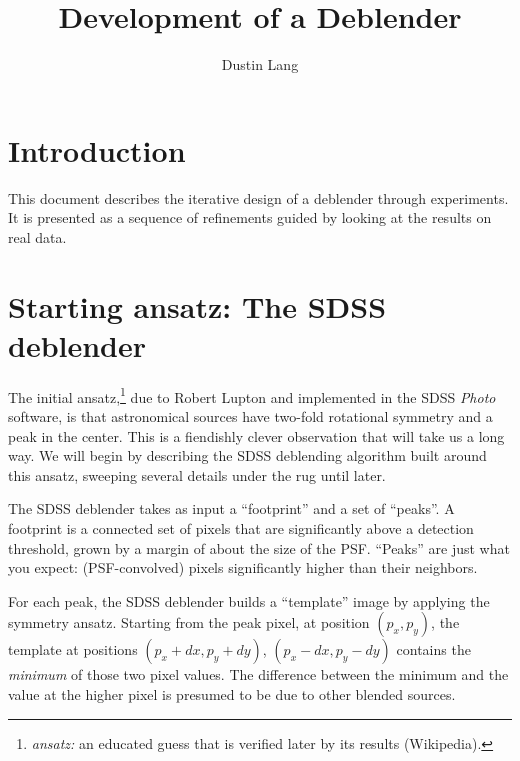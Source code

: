 \documentclass[10pt,letter]{article}
\author{Dustin Lang}
\title{Development of a Deblender}
\begin{document}
\maketitle

\section{Introduction}

This document describes the iterative design of a deblender through
experiments.  It is presented as a sequence of refinements guided by
looking at the results on real data.


%
% 


\section{Starting ansatz: The SDSS deblender}

The initial ansatz,\footnote{%
  \emph{ansatz:} an educated guess that is verified later by its results (Wikipedia).}
 due to Robert Lupton \cite{rhldeblend} and
implemented in the SDSS \emph{Photo} software, is that astronomical
sources have two-fold rotational symmetry and a peak in the center.
This is a fiendishly clever observation that will take us a long way.
We will begin by describing the SDSS deblending algorithm built around
this ansatz, sweeping several details under the rug until later.

The SDSS deblender takes as input a ``footprint'' and a set of
``peaks''.  A footprint is a connected set of pixels that are
significantly above a detection threshold, grown by a margin of about
the size of the PSF.  ``Peaks'' are just what you expect:
(PSF-convolved) pixels significantly higher than their neighbors.

For each peak, the SDSS deblender builds a ``template'' image by
applying the symmetry ansatz.  Starting from the peak pixel, at
position $(p_x,p_y)$, the template at positions $(p_x + dx, p_y +
dy)$, $(p_x - dx, p_y - dy)$ contains the \emph{minimum} of those two
pixel values.  The difference between the minimum and the value at the
higher pixel is presumed to be due to other blended sources.
\end{document}
